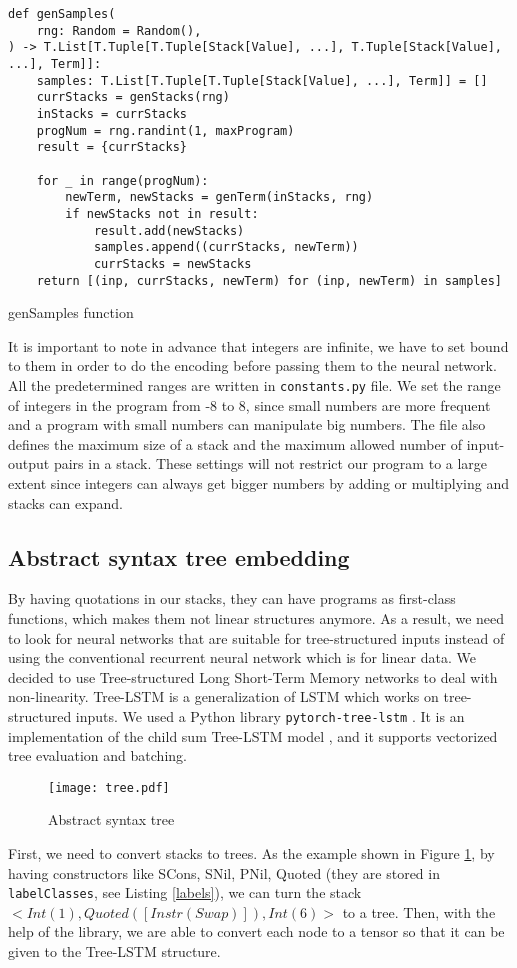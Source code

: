 \begin{listing}[H]
\begin{verbatim}
def genSamples(
    rng: Random = Random(),
) -> T.List[T.Tuple[T.Tuple[Stack[Value], ...], T.Tuple[Stack[Value], ...], Term]]:
    samples: T.List[T.Tuple[T.Tuple[Stack[Value], ...], Term]] = []
    currStacks = genStacks(rng)
    inStacks = currStacks
    progNum = rng.randint(1, maxProgram)
    result = {currStacks}

    for _ in range(progNum):
        newTerm, newStacks = genTerm(inStacks, rng)
        if newStacks not in result:
            result.add(newStacks)
            samples.append((currStacks, newTerm))
            currStacks = newStacks
    return [(inp, currStacks, newTerm) for (inp, newTerm) in samples]
\end{verbatim}
\caption{genSamples function}
\label{fun:genSamples}
\end{listing}

It is important to note in advance that integers are infinite, we have to set bound to them in order to do the encoding before passing them to the neural network. All the predetermined ranges are written in \texttt{constants.py} file. We set the range of integers in the program from -8 to 8, since small numbers are more frequent and a program with small numbers can manipulate big numbers. The file also defines the maximum size of a stack and the maximum allowed number of input-output pairs in a stack. These settings will not restrict our program to a large extent since integers can always get bigger numbers by adding or multiplying and stacks can expand. 
\subsection{Abstract syntax tree embedding}
\label{sec:ast}
By having quotations in our stacks, they can have programs as first-class functions, which makes them not linear structures anymore. As a result, we need to look for neural networks that are suitable for tree-structured inputs instead of using the conventional recurrent neural network which is for linear data. We decided to use Tree-structured Long Short-Term Memory \cite{tree-lstm} networks to deal with non-linearity. Tree-LSTM is a generalization of LSTM which works on tree-structured inputs. We used a Python library \texttt{pytorch-tree-lstm} \cite{pytorch-tree-lstm}. It is an implementation of the child sum Tree-LSTM model \cite{tree-lstm}, and it supports vectorized tree evaluation and batching.
\begin{figure}[H]
    \centering
    \texttt{[image: tree.pdf]}
    \caption{Abstract syntax tree}
    \label{fig:tree}
\end{figure}
First, we need to convert stacks to trees. As the example shown in Figure \ref{fig:tree}, by having constructors like SCons, SNil, PNil, Quoted (they are stored in \texttt{labelClasses}, see Listing \ref{labels}), we can turn the stack $<Int(1), Quoted([Instr(Swap)]), Int(6)>$ to a tree. Then, with the help of the library, we are able to convert each node to a tensor so that it can be given to the Tree-LSTM structure.  

